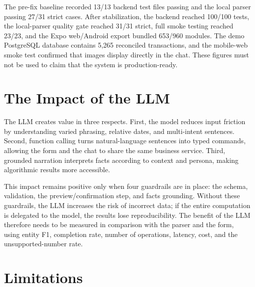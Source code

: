 The pre-fix baseline recorded 13/13 backend test files passing and the local parser passing 27/31 strict cases. After stabilization, the backend reached 100/100 tests, the local-parser quality gate reached 31/31 strict, full smoke testing reached 23/23, and the Expo web/Android export bundled 653/960 modules. The demo PostgreSQL database contains 5,265 reconciled transactions, and the mobile-web smoke test confirmed that images display directly in the chat. These figures must not be used to claim that the system is production-ready.

\section{The Impact of the LLM}

The LLM creates value in three respects. First, the model reduces input friction by understanding varied phrasing, relative dates, and multi-intent sentences. Second, function calling turns natural-language sentences into typed commands, allowing the form and the chat to share the same business service. Third, grounded narration interprets facts according to context and persona, making algorithmic results more accessible.

This impact remains positive only when four guardrails are in place: the schema, validation, the preview/confirmation step, and facts grounding. Without these guardrails, the LLM increases the risk of incorrect data; if the entire computation is delegated to the model, the results lose reproducibility. The benefit of the LLM therefore needs to be measured in comparison with the parser and the form, using entity F1, completion rate, number of operations, latency, cost, and the unsupported-number rate.

\section{Limitations}

